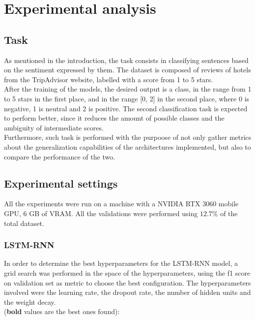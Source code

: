 \section{Experimental analysis}
\label{sec:experimental_analysis}
    \subsection{Task}
      \label{sec:task}
        As mentioned in the introduction, the task consists in classifying sentences
        based on the sentiment expressed by them. The dataset is composed of reviews
        of hotels from the TripAdvisor website, labelled with a score from 1 to 5 stars. \\ 
        
        After the training of the models, the desired output is a class, in the range from 
        1 to 5 stars in the first place, and in the range [0, 2] in the second place, where 
        0 is negative, 1 is neutral and 2 is positive. The second classification task
        is expected to perform better, since it reduces the amount of possible classes
        and the ambiguity of intermediate scores. \\
        
        Furthermore, such task is performed with the purpoose of not only gather 
        metrics about the generalization capabilities of the architectures implemented,
        but also to compare the performance of the two. \\     

    \subsection{Experimental settings}
      \label{sec:experimental_settings}
        All the experiments were run on a machine with a NVIDIA RTX 3060 mobile GPU, 6 GB of VRAM.
        All the validations were performed using $12.7\%$ of the total dataset.


        \subsubsection{LSTM-RNN}
        \label{subsubsec:lstm_rnn}
            In order to determine the best hyperparameters for the LSTM-RNN model, a grid
            search was performed in the space of the hyperparameters, using the f1 score on
            validation set as metric to choose the best configuration. The hyperparameters 
            involved were the learning rate, the dropout rate, the number of hidden units
            and the weight decay. \\ 
            (\textbf{bold} values are the best ones found):

